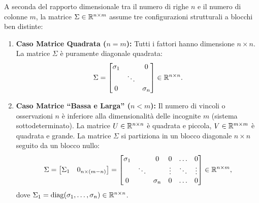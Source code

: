 A seconda del rapporto dimensionale tra il numero di righe $n$ e il numero di colonne $m$, la matrice $\Sigma \in \mathbb{R}^{n \times m}$ assume tre configurazioni strutturali a blocchi ben distinte:

\begin{enumerate}
    \item \textbf{Caso Matrice Quadrata ($n = m$):}
    Tutti i fattori hanno dimensione $n \times n$. La matrice $\Sigma$ \`e puramente diagonale quadrata:
    \begin{equation}
        \Sigma = \begin{bmatrix}
            \sigma_1 & & 0 \\
            & \ddots & \\
            0 & & \sigma_n
        \end{bmatrix} \in \mathbb{R}^{n \times n}.
    \end{equation}

    \item \textbf{Caso Matrice ``Bassa e Larga'' ($n < m$):}
    Il numero di vincoli o osservazioni $n$ \`e inferiore alla dimensionalit\`a delle incognite $m$ (sistema sottodeterminato). La matrice $U \in \mathbb{R}^{n \times n}$ \`e quadrata e piccola, $V \in \mathbb{R}^{m \times m}$ \`e quadrata e grande. La matrice $\Sigma$ si partiziona in un blocco diagonale $n \times n$ seguito da un blocco nullo:
    \begin{equation}
        \Sigma = \begin{bmatrix} \Sigma_1 & 0_{n \times (m - n)} \end{bmatrix} = \begin{bmatrix}
            \sigma_1 & & 0 & 0 & \dots & 0 \\
            & \ddots & & \vdots & \ddots & \vdots \\
            0 & & \sigma_n & 0 & \dots & 0
        \end{bmatrix} \in \mathbb{R}^{n \times m},
    \end{equation}
    dove $\Sigma_1 = \operatorname{diag}(\sigma_1, \dots, \sigma_n) \in \mathbb{R}^{n \times n}$.


\end{enumerate}
